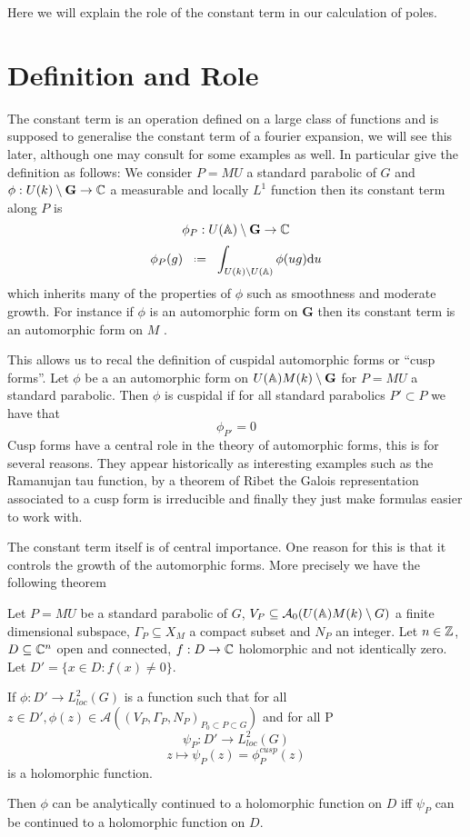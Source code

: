 Here we will explain the role of the constant term in our calculation of poles.

\section{Definition and Role} \label{cuspidal_form_definition}
The constant term is an operation defined on a large class of functions and is supposed to generalise the constant term of a fourier expansion, we will see this later, although one may consult \cite[1.6]{bumpAutomorphicFormsRepresentations1997} for some examples as well. In particular \cite[I.2.6]{moeglinSpectralDecompositionEisenstein1995} give the definition as follows: We consider \(P=MU\) a standard parabolic of \(G\) and \(\phi: U(k)\setminus \mathbf{G} \to \C\) a measurable and locally \(L^1\) function then its constant term along \(P\) is 
\[\phi_P :  U(\A)\setminus \mathbf{G} \to \C\]
\[\phi_P(g) \defeq \int_{U(k)\setminus U(\A)}\phi(ug) \mathrm{d}u\]
which inherits many of the properties of \(\phi\) such as smoothness and moderate growth. For instance if \(\phi\) is an automorphic form on \(\mathbf{G}\) then its constant term is an automorphic form on \(M\) \cite[6.5]{getzIntroductionAutomorphicRepresentations2024}.

This allows us to recal the definition of cuspidal automorphic forms or ``cusp forms''. Let \(\phi\) be a an automorphic form on \(U(\A)M(k)\setminus \mathbf{G}\) for \(P = MU\) a standard parabolic. Then \(\phi\) is cuspidal if for all standard parabolics \(P'\subset P\) we have that 
\[\phi_{P'} = 0\]
Cusp forms have a central role in the theory of automorphic forms, this is for several reasons. They appear historically as interesting examples such as the Ramanujan tau function, by a theorem of Ribet \cite[T2.3]{serreProceedingsInternationalConference1977} the Galois representation associated to a cusp form is irreducible and finally they just make formulas easier to work with.

The constant term itself is of central importance. One reason for this is that it controls the growth of the automorphic forms. More precisely we have the following theorem \cite[I.4.10]{moeglinSpectralDecompositionEisenstein1995}

\begin{Theorem}
        Let \(P = MU\) be a standard parabolic of \(G\), \(V_P\subseteq \mathcal{A}_0(U(\A)M(k)\setminus G)\) a finite dimensional subspace, \(\Gamma_P\subseteq X_M\) a compact subset and \(N_P\) an integer. Let \(n\in \Z\), \(D\subseteq \C^n\) open and connected, \(f: D\to \C\) holomorphic and not identically zero. Let \(D' = \{x\in D : f(x)\neq 0\}\).

        If \(\phi: D' \to L^2_{loc}(G)\) is a function such that for all \(z\in D', \phi(z)\in \mathcal{A}((V_P, \Gamma_P, N_P)_{P_0\subset P \subset G})\) and for all P 
        \[\psi_P: D' \to L^2_{loc}(G)\]
        \[z \mapsto \psi_P(z) = \phi_P^{cusp}(z)\]
        is a holomorphic function. 

        Then \(\phi\) can be analytically continued to a holomorphic function on \(D\) iff \(\psi_P\) can be continued to a holomorphic function on \(D\).
    \end{Theorem}
    
